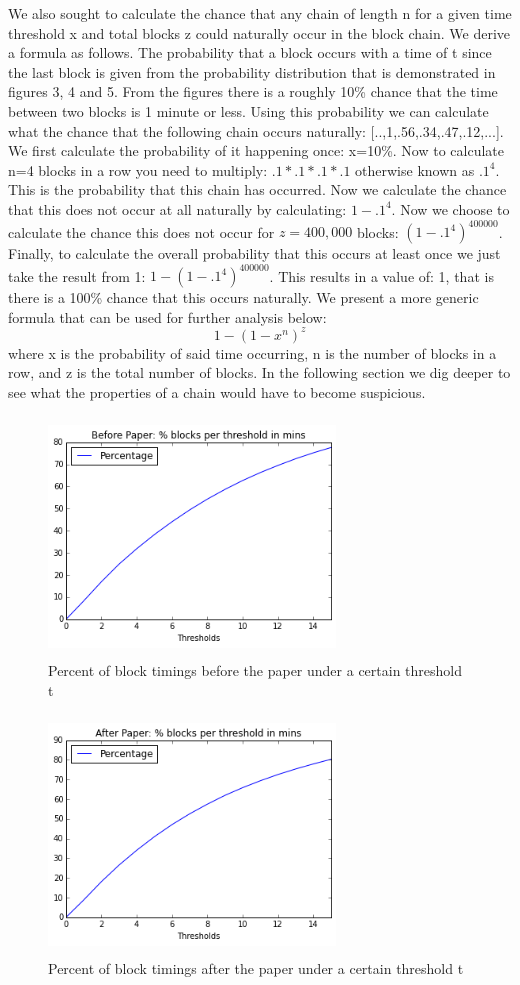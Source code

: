 \documentclass{sig-alternate-05-2015}
\begin{document}
We also sought to calculate the chance that any chain of length n for a given time threshold x and total blocks z could naturally occur in the block chain. We derive a formula as follows. The probability that a block occurs with a time of t since the last block is given from the probability distribution that is demonstrated in figures 3, 4 and 5. From the figures there is a roughly 10\% chance that the time between two blocks is 1 minute or less. Using this probability we can calculate what the chance that the following chain occurs naturally: [..,1,.56,.34,.47,.12,...]. We first calculate the probability of it happening once: x=10\%. Now to calculate n=4 blocks in a row you need to multiply: \(.1*.1*.1*.1\) otherwise known as \(.1^4\). This is the probability that this chain has occurred. Now we calculate the chance that this does not occur at all naturally by calculating: \(1-.1^4\). Now we choose to calculate the chance this does not occur for \(z=400,000\) blocks: \((1-.1^4)^{400000}\). Finally, to calculate the overall probability that this occurs at least once we just take the result from 1:  \(1-(1-.1^4)^{400000}\). This results in a value of: 1, that is there is a 100\% chance that this occurs naturally. We present a more generic formula that can be used for further analysis below: \[1-(1-x^n)^{z}\]  where x is the probability of said time occurring, n is the number of blocks in a row, and z is the total number of blocks. In the following section we dig deeper to see what the properties of a chain would have to become suspicious.
\begin{figure}
\centering
\includegraphics[height=2.5in, width=3in]{before.png}
\caption{ Percent of block timings before the paper under a certain threshold t}
\end{figure}

\begin{figure}
\centering
\includegraphics[height=2.5in, width=3in]{after.png}
\caption{ Percent of block timings after the paper under a certain threshold t}
\end{figure}
\end{document}
